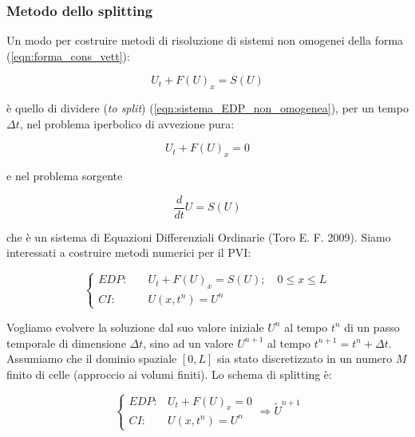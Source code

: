 \documentclass[12pt]{article} %
\begin{document}
\subsubsection{Metodo dello splitting}

\noindent Un modo per costruire metodi di risoluzione di sistemi non omogenei della forma (\ref{eqn:forma_cons_vett}):

\begin{equation}
    U_t+F(U)_x=S(U)
    \label{eqn:sistema_EDP_non_omogenea}
\end{equation}

\noindent è quello di dividere (\textit{to split}) (\ref{eqn:sistema_EDP_non_omogenea}), per un tempo $\Delta t$, nel problema iperbolico di avvezione pura:

\begin{equation}
    U_t+F(U)_x = 0
    \label{eqn:avvezione_pura}
\end{equation}

\noindent e nel problema sorgente

\begin{equation}
    \frac{d}{dt}U = S(U)
\end{equation}

\noindent che è un sistema di Equazioni Differenziali Ordinarie (Toro E. F. 2009).
Siamo interessati a costruire metodi numerici per il PVI:

\begin{equation}
    \begin{cases} EDP:\quad &U_t+F(U)_x = S(U);\quad 0\leq x \leq L\\
    CI: &U(x,t^n)=U^n
    \end{cases}
    \label{eqn:PVI_completo}
\end{equation}

\noindent Vogliamo evolvere la soluzione dal suo valore iniziale $U^n$ al tempo $t^n$ di un passo temporale di dimensione $\Delta t$, sino ad un valore $U^{n+1}$ al tempo $t^{n+1} = t^n + \Delta t$. Assumiamo che il dominio spaziale $[0, L]$ sia stato discretizzato in un numero $M$ finito di celle (approccio ai volumi finiti). Lo schema di splitting è:

\begin{equation}
    \left\{\begin{array}{lr}
        EDP: & U_t+F(U)_x = 0\\
        CI: & U(x,t^n)=U^n
        \end{array}
    \right. \Longrightarrow \tilde{U}^{n+1}
    \label{eqn:PVI_avvettivo}
\end{equation}
\end{document}
